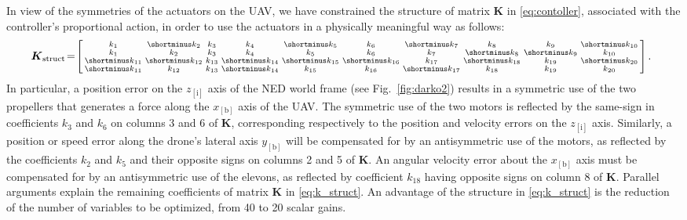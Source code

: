 In view of the symmetries of the actuators on the UAV, we have constrained the structure of matrix $\boldsymbol{K}$ in \eqref{eq:contoller}, associated with the controller's proportional action, in order to use the actuators in a physically meaningful way as follows:
\begin{align}
\label{eq:k_struct}
    \!\!\!\boldsymbol{K}_{\text{struct}} \!=\!  \smallmat{
             k_{1}& \shortminus k_{2}& k_{3}&  k_{4}& \shortminus k_{5}&  k_{6}& \shortminus k_{7}&  k_{8}&  k_{9}& \shortminus k_{10}\\
             k_{1}&  k_{2}& k_{3}&  k_{4}&  k_{5}&  k_{6}&   k_{7}& \shortminus k_{8}& \shortminus k_{9}&  k_{10}\\
            \shortminus k_{11}& \shortminus k_{12}& k_{13}& \shortminus k_{14}& \shortminus k_{15}& \shortminus k_{16}&   k_{17}& \shortminus k_{18}&  k_{19}& \shortminus k_{20}\\
            \shortminus k_{11}&  k_{12}& k_{13}& \shortminus k_{14}&  k_{15}&  k_{16}&   \shortminus k_{17}&  k_{18}&  k_{19}&  k_{20} 
         }.
\end{align}
In particular, a position error on the $z_{[\text{i}]}$ axis of the NED world frame (see Fig.~\ref{fig:darko2}) results in a symmetric use of the two propellers that generates a force along the $x_{[\text{b}]}$ axis of the UAV. The symmetric use of the two motors is reflected by the same-sign in coefficients $k_{3}$ and $k_{6}$ on columns 3 and 6 of $\boldsymbol{K}$, corresponding respectively to the position and velocity errors on the $z_{[\text{i}]}$ axis. Similarly, a position or speed error along the drone's lateral axis $y_{[\text{b}]}$ will be compensated for by an antisymmetric use of the motors, as reflected by the coefficients $k_{2}$ and $k_{5}$ and their opposite signs on columns 2 and 5 of $\boldsymbol{K}$. An angular velocity error about the  $x_{[\text{b}]}$ axis must be compensated for by an antisymmetric use of the elevons, as reflected by coefficient $k_{18}$ having opposite signs on column 8 of $\boldsymbol{K}$. Parallel arguments explain the remaining coefficients of matrix $\boldsymbol{K}$ in \eqref{eq:k_struct}. An advantage of the structure in \eqref{eq:k_struct} is the reduction of the number of variables to be optimized, from 40 to 20 scalar gains.


